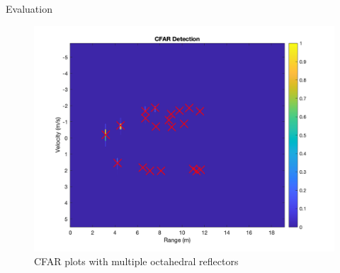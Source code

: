 \documentclass{beamer}
\begin{document}
\begin{frame}[t]{Evaluation}
\begin{itemize}
\begin{figure}
\begin{minipage}{0.45\textwidth}
                    \includegraphics[height=0.8\textwidth]{figures/5c_octahedral.png}
                    \caption{CFAR plots with multiple octahedral reflectors}
                \end{minipage}
            \end{figure}
	\end{itemize}
\end{frame}
\end{document}
